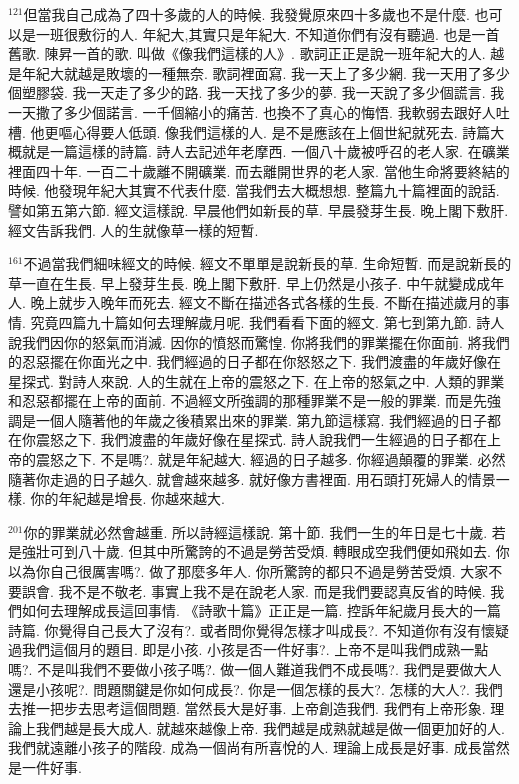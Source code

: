 \documentclass{book}
\begin{document}
$^{121}$但當我自己成為了四十多歲的人的時候.
我發覺原來四十多歲也不是什麼.
也可以是一班很敷衍的人.
年紀大,其實只是年紀大.
不知道你們有沒有聽過.
也是一首舊歌.
陳昇一首的歌.
叫做《像我們這樣的人》.
歌詞正正是說一班年紀大的人.
越是年紀大就越是敗壞的一種無奈.
歌詞裡面寫.
我一天上了多少網.
我一天用了多少個塑膠袋.
我一天走了多少的路.
我一天找了多少的夢.
我一天說了多少個謊言.
我一天撒了多少個諾言.
一千個縮小的痛苦.
也換不了真心的悔悟.
我軟弱去跟好人吐槽.
他更嘔心得要人低頭.
像我們這樣的人.
是不是應該在上個世紀就死去.
詩篇大概就是一篇這樣的詩篇.
詩人去記述年老摩西.
一個八十歲被呼召的老人家.
在礦業裡面四十年.
一百二十歲離不開礦業.
而去離開世界的老人家.
當他生命將要終結的時候.
他發現年紀大其實不代表什麼.
當我們去大概想想.
整篇九十篇裡面的說話.
譬如第五第六節.
經文這樣說.
早晨他們如新長的草.
早晨發芽生長.
晚上閣下敷肝.
經文告訴我們.
人的生就像草一樣的短暫.

$^{161}$不過當我們細味經文的時候.
經文不單單是說新長的草.
生命短暫.
而是說新長的草一直在生長.
早上發芽生長.
晚上閣下敷肝.
早上仍然是小孩子.
中午就變成成年人.
晚上就步入晚年而死去.
經文不斷在描述各式各樣的生長.
不斷在描述歲月的事情.
究竟四篇九十篇如何去理解歲月呢.
我們看看下面的經文.
第七到第九節.
詩人說我們因你的怒氣而消滅.
因你的憤怒而驚惶.
你將我們的罪業擺在你面前.
將我們的忍惡擺在你面光之中.
我們經過的日子都在你怒怒之下.
我們渡盡的年歲好像在星探式.
對詩人來說.
人的生就在上帝的震怒之下.
在上帝的怒氣之中.
人類的罪業和忍惡都擺在上帝的面前.
不過經文所強調的那種罪業不是一般的罪業.
而是先強調是一個人隨著他的年歲之後積累出來的罪業.
第九節這樣寫.
我們經過的日子都在你震怒之下.
我們渡盡的年歲好像在星探式.
詩人說我們一生經過的日子都在上帝的震怒之下.
不是嗎?.
就是年紀越大.
經過的日子越多.
你經過顛覆的罪業.
必然隨著你走過的日子越久.
就會越來越多.
就好像方書裡面.
用石頭打死婦人的情景一樣.
你的年紀越是增長.
你越來越大.

$^{201}$你的罪業就必然會越重.
所以詩經這樣說.
第十節.
我們一生的年日是七十歲.
若是強壯可到八十歲.
但其中所驚誇的不過是勞苦受煩.
轉眼成空我們便如飛如去.
你以為你自己很厲害嗎?.
做了那麼多年人.
你所驚誇的都只不過是勞苦受煩.
大家不要誤會.
我不是不敬老.
事實上我不是在說老人家.
而是我們要認真反省的時候.
我們如何去理解成長這回事情.
《詩歌十篇》正正是一篇.
控訴年紀歲月長大的一篇詩篇.
你覺得自己長大了沒有?.
或者問你覺得怎樣才叫成長?.
不知道你有沒有懷疑過我們這個月的題目.
即是小孩.
小孩是否一件好事?.
上帝不是叫我們成熟一點嗎?.
不是叫我們不要做小孩子嗎?.
做一個人難道我們不成長嗎?.
我們是要做大人還是小孩呢?.
問題關鍵是你如何成長?.
你是一個怎樣的長大?.
怎樣的大人?.
我們去推一把步去思考這個問題.
當然長大是好事.
上帝創造我們.
我們有上帝形象.
理論上我們越是長大成人.
就越來越像上帝.
我們越是成熟就越是做一個更加好的人.
我們就遠離小孩子的階段.
成為一個尚有所喜悅的人.
理論上成長是好事.
成長當然是一件好事.
\end{document}
